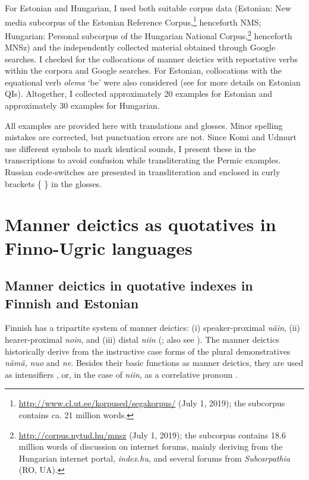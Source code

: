 \documentclass[output=paper,colorlinks,citecolor=brown]{langscibook}
\begin{document}
For Estonian and Hungarian, I used both suitable corpus data (Estonian: New media subcorpus of the Estonian Reference Corpus,\footnote{\url{http://www.cl.ut.ee/korpused/segakorpus/} (July 1, 2019); the subcorpus contains ca. 21 million words.} henceforth  NMS; Hungarian: Personal subcorpus of the Hungarian National Corpus,\footnote{\url{http://corpus.nytud.hu/mnsz} (July 1, 2019); the subcorpus contains 18.6 million words of discussion on internet forums, mainly deriving from the Hungarian internet portal, \textit{index.hu}, and several forums from \textit{Subcarpathia} (RO, UA).} henceforth MNSz) and the independently collected material obtained through Google searches. I checked for the collocations of manner deictics with reportative verbs within the corpora and Google searches. For Estonian, collocations with the equational verb \textit{olema} ‘be’ were also considered (see \citealt{Teptiuk2019} for more details on Estonian QIs). Altogether, I collected approximately 20 examples for Estonian and approximately 30 examples for Hungarian.

All examples are provided here with translations and glosses. Minor spelling mistakes are corrected, but punctuation errors are not. Since Komi and Udmurt use different symbols to mark identical sounds, I present these in the transcriptions to avoid confusion while transliterating the Permic examples. Russian code-switches are presented in transliteration and enclosed in curly brackets \{ \} in the glosses.

\section{Manner deictics as quotatives in Finno-Ugric languages}\label{sec:teptiuk:4}
\subsection{Manner deictics in quotative indexes in Finnish and Estonian}\label{sec:teptiuk:4.1}

Finnish has a tripartite system of manner deictics: (i) speaker-proximal \textit{näin}, (ii) hearer-proximal \textit{noin}, and (iii) distal \textit{niin} (\citealt[147]{König2017}; also see \citealt[§668]{HakulinenEtAl2004}). The manner deictics historically derive from the instructive case forms of the plural demonstratives \textit{nämä,} \textit{nuo} and \textit{ne}. Besides their basic functions as manner deictics, they are used as intensifiers \citep[§792]{HakulinenEtAl2004}, or, in the case of \textit{niin}, as a correlative pronoun \citep[§1160, §1172]{HakulinenEtAl2004}.
\end{document}

